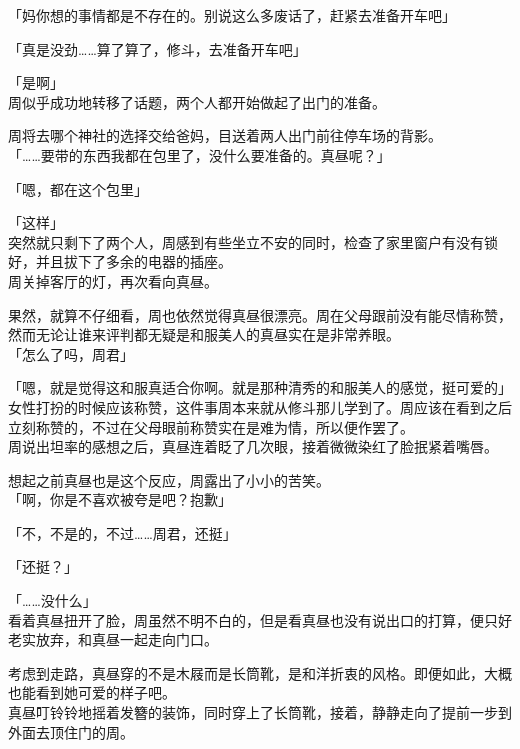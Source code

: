 「妈你想的事情都是不存在的。别说这么多废话了，赶紧去准备开车吧」

「真是没劲……算了算了，修斗，去准备开车吧」

「是啊」\\

周似乎成功地转移了话题，两个人都开始做起了出门的准备。

周将去哪个神社的选择交给爸妈，目送着两人出门前往停车场的背影。\\

「……要带的东西我都在包里了，没什么要准备的。真昼呢？」

「嗯，都在这个包里」

「这样」\\

突然就只剩下了两个人，周感到有些坐立不安的同时，检查了家里窗户有没有锁好，并且拔下了多余的电器的插座。\\

周关掉客厅的灯，再次看向真昼。

果然，就算不仔细看，周也依然觉得真昼很漂亮。周在父母跟前没有能尽情称赞，然而无论让谁来评判都无疑是和服美人的真昼实在是非常养眼。\\

「怎么了吗，周君」

「嗯，就是觉得这和服真适合你啊。就是那种清秀的和服美人的感觉，挺可爱的」\\

女性打扮的时候应该称赞，这件事周本来就从修斗那儿学到了。周应该在看到之后立刻称赞的，不过在父母眼前称赞实在是难为情，所以便作罢了。\\

周说出坦率的感想之后，真昼连着眨了几次眼，接着微微染红了脸抿紧着嘴唇。

想起之前真昼也是这个反应，周露出了小小的苦笑。\\

「啊，你是不喜欢被夸是吧？抱歉」

「不，不是的，不过……周君，还挺」

「还挺？」

「……没什么」\\

看着真昼扭开了脸，周虽然不明不白的，但是看真昼也没有说出口的打算，便只好老实放弃，和真昼一起走向门口。

考虑到走路，真昼穿的不是木屐而是长筒靴，是和洋折衷的风格。即便如此，大概也能看到她可爱的样子吧。\\

真昼叮铃铃地摇着发簪的装饰，同时穿上了长筒靴，接着，静静走向了提前一步到外面去顶住门的周。

